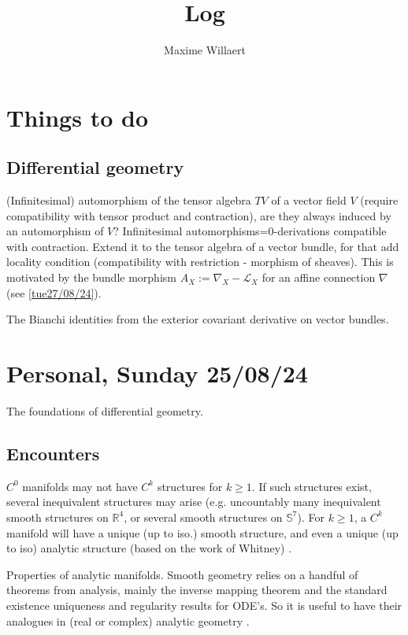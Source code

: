 \documentclass[a4paper,12pt,parskip=half*,chapterprefix=true,numbers=noendperiod]{scrreprt}
\title{Log}
\author{Maxime Willaert}
\theoremstyle{definition}
\theoremstyle{remark}
\begin{document}
\maketitle

\tableofcontents

\section{Things to do}

\subsection{Differential geometry}

(Infinitesimal) automorphism of the tensor algebra $TV$ of a vector field $V$ (require compatibility with tensor product and contraction), are they always induced by an automorphism of $V$? Infinitesimal automorphisms=0-derivations compatible with contraction.
Extend it to the tensor algebra of a vector bundle, for that add locality condition (compatibility with restriction - morphism of sheaves). This is motivated by the bundle morphism $A_X:=\nabla_X-\mathcal{L}_X$ for an affine connection $\nabla$ (see \ref{tue27/08/24}).

The Bianchi identities from the exterior covariant derivative on vector bundles.

\section{Personal, Sunday 25/08/24}

The foundations of differential geometry.

\subsection{Encounters}

$C^0$ manifolds may not have $C^k$ structures for $k\geq 1$. If such structures exist, several inequivalent structures may arise (e.g. uncountably many inequivalent smooth structures on $\mathbb{R}^4$, or several smooth structures on $\mathbb{S}^7$). For $k\geq 1$, a $C^k$ manifold will have a unique (up to iso.) smooth structure, and even a unique (up to iso) analytic structure (based on the work of Whitney) \cite{Overflow:ManifoldAnalyticStructure,Stack:WhitneyAnalyticEmbedding}.

Properties of analytic manifolds. Smooth geometry relies on a handful of theorems from analysis, mainly the inverse mapping theorem and the standard existence uniqueness and regularity results for ODE's. So it is useful to have their analogues in (real or complex) analytic geometry \cite{Narasimhan:AnalysisRealComplexMan,Bourbaki:VarietesDiffAnalytic}.
\end{document}
